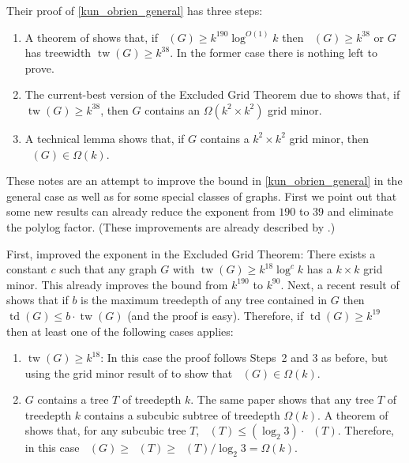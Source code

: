 \documentclass{patmorin}
\DeclareMathOperator{\tw}{tw}
\DeclareMathOperator{\td}{td}
\DeclareMathOperator{\chicen}{\chi_{\mathrm{cen}}}
\DeclareMathOperator{\chilin}{\chi_{\mathrm{lin}}}
\begin{document}
Their proof of \cref{kun_obrien_general} has three steps:
\begin{enumerate}
  \item A theorem of \citet{kawarabayashi.rossman:polynomial} shows that, if $\chicen(G)\ge k^{190}\log^{O(1)} k$ then $\chilin(G)\ge k^{38}$ or $G$ has treewidth $\tw(G)\ge k^{38}$.  In the former case there is nothing left to prove.
  \item The current-best version of the Excluded Grid Theorem due to \citet{chuzhoy:improved} shows that, if $\tw(G)\ge k^{38}$, then $G$ contains an $\Omega(k^2\times k^2)$ grid minor.
  \item A technical lemma \cite[Lemma~5]{kun.obrien.ea:polynomial} shows that, if $G$ contains a $k^2\times k^2$ grid minor, then $\chilin(G)\in\Omega(k)$.
\end{enumerate}

These notes are an attempt to improve the bound in \cref{kun_obrien_general} in the general case as well as for some special classes of graphs. First we point out that some new results can already reduce the exponent from $190$ to $39$ and eliminate the polylog factor.  (These improvements are already described by \citet[Theorem~1.9]{czerwinski.nadara.ea:improved}.)

First, \citet{chuzhoy.tan:towards} improved the exponent in the Excluded Grid Theorem:  There exists a constant $c$ such that any graph $G$ with $\tw(G)\ge k^{18}\log^c k$ has a $k\times k$ grid minor.  This already improves the bound from $k^{190}$ to $k^{90}$.
Next, a recent result of \citet[Theorem~1.4]{czerwinski.nadara.ea:improved} shows that if $b$ is the maximum treedepth of any tree contained in $G$ then $\td(G)\le b\cdot\tw(G)$ (and the proof is easy).  Therefore, if $\td(G)\ge k^{19}$ then at least one of the following cases applies:
\begin{enumerate}
    \item $\tw(G)\ge k^{18}$: In this case the proof follows Steps~2 and 3 as before, but using the grid minor result of \citet{chuzhoy.tan:towards} to show that $\chilin(G)\in\Omega(k)$.
    \item $G$ contains a tree $T$ of treedepth $k$.  The same paper \cite[Lemma~1.6]{czerwinski.nadara.ea:improved} shows that any tree $T$ of treedepth $k$ contains a subcubic subtree of treedepth $\Omega(k)$.
    A theorem of \citet{kun.obrien.ea:polynomial} shows that, for any subcubic tree $T$, $\chicen(T) \le (\log_2 3)\cdot\chilin(T)$.  Therefore, in this case $\chilin(G)\ge\chilin(T)\ge \chicen(T)/\log_2 3 = \Omega(k)$.
\end{enumerate}
\end{document}
